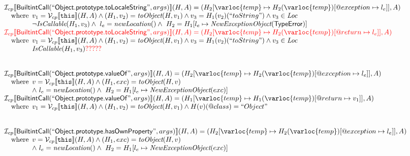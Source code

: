 \[\begin{array}{l}
\I _{cp}\lbr \SF{BuiltintCall}(``\SF{Object.prototype.toLocaleString}",args)\rbr(H,A)
 = (H_2[\varloc{temp}\mapsto H_2(\varloc{temp})[\varprop{exception}\mapsto l_e]], A) \\
\quad\wherec{
  v_1 = \V _{cp}\lbr \TT{this}\rbr (H,A) \land (H_1, v_2) = \hf{toObject}(H, v_1)
  \land  v_3 = H_1(v_2)(``toString") \land v_3 \in \Loc\\
  \neg \hf{IsCallable}(H_1, v_3)
  \land\ l_e = \hf{newLocation}() \land\ H_2=H_1[l_e\mapsto\hf{NewExceptionObject}(\SF{TypeError})]
  }\\
  
\inred \I _{cp}\lbr \SF{BuiltintCall}(``\SF{Object.prototype.toLocaleString}",args)\rbr(H,A)
 = (H_2[\varloc{temp}\mapsto H_2(\varloc{temp})[\varprop{return}\mapsto l_e]], A) \\
\quad\wherec{
  v_1 = \V _{cp}\lbr \TT{this}\rbr (H,A) \land (H_1, v_2) = \hf{toObject}(H, v_1)
  \land  v_3 = H_1(v_2)(``toString") \land v_3 \in \Loc\\
  \hf{IsCallable}(H_1, v_3)
  \inred ?????
  }\\
\\\\



\I _{cp}\lbr \SF{BuiltintCall}(``\SF{Object.prototype.valueOf}",args)\rbr(H,A)
 = (H_2[\varloc{temp}\mapsto H_2(\varloc{temp})[\varprop{exception}\mapsto l_e]], A) \\
\quad\wherec{
  v = \V _{cp}\lbr \TT{this}\rbr (H,A) \land (H_1, exc) = \hf{toObject}(H, v)\\
  \land\ l_e = \hf{newLocation}() \land\ H_2=H_1[l_e\mapsto\hf{NewExceptionObject}(exc)] 
  }\\
  
\I _{cp}\lbr \SF{BuiltintCall}(``\SF{Object.prototype.valueOf}",args)\rbr(H,A)
 = (H_1[\varloc{temp}\mapsto H_1(\varloc{temp})[\varprop{return}\mapsto v_1]], A) \\
\quad\wherec{
  v_1 = \V _{cp}\lbr \TT{this}\rbr (H,A) \land (H_1, v_2) = \hf{toObject}(H, v_1)
  \land H(v)(\varprop{class})=``Object"
  }\\
\\\\



\I _{cp}\lbr \SF{BuiltintCall}(``\SF{Object.prototype.hasOwnProperty}",args)\rbr(H,A)
 = (H_2[\varloc{temp}\mapsto H_2(\varloc{temp})[\varprop{exception}\mapsto l_e]], A) \\
\quad\wherec{
  v = \V _{cp}\lbr \TT{this}\rbr (H,A) \land (H_1, exc) = \hf{toObject}(H, v)\\
  \land\ l_e = \hf{newLocation}() \land\ H_2=H_1[l_e\mapsto\hf{NewExceptionObject}(exc)] 
  }\\
  

\end{array}\]
